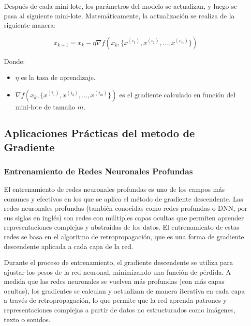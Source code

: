 \documentclass{article}
\begin{document}
	Después de cada mini-lote, los parámetros del modelo se actualizan, y luego se pasa al siguiente mini-lote.
	Matemáticamente, la actualización se realiza de la siguiente manera:
	
	\[
	x_{k+1} = x_k - \eta \nabla f\left(x_k, \{ x^{(i_1)}, x^{(i_2)}, \dots, x^{(i_m)} \} \right)
	\]
	
	Donde:
	\begin{itemize}
		\item \( \eta \) es la tasa de aprendizaje.
		\item \( \nabla f\left(x_k, \{ x^{(i_1)}, x^{(i_2)}, \dots, x^{(i_m)} \} \right) \) es el gradiente calculado en función del mini-lote de tamaño \( m \).
	\end{itemize}
	
	\subsection{Aplicaciones Prácticas del metodo de Gradiente}
	
	\subsubsection{Entrenamiento de Redes Neuronales Profundas}
	
	El entrenamiento de redes neuronales profundas es uno de los campos más comunes y efectivos en los que se aplica el método de gradiente descendente. Las redes neuronales profundas (también conocidas como redes profundas o DNN, por sus siglas en inglés) son redes con múltiples capas ocultas que permiten aprender representaciones complejas y abstraídas de los datos. El entrenamiento de estas redes se basa en el algoritmo de retropropagación, que es una forma de gradiente descendente aplicada a cada capa de la red.
	
	Durante el proceso de entrenamiento, el gradiente descendente se utiliza para ajustar los pesos de la red neuronal, minimizando una función de pérdida. A medida que las redes neuronales se vuelven más profundas (con más capas ocultas), los gradientes se calculan y actualizan de manera iterativa en cada capa a través de retropropagación, lo que permite que la red aprenda patrones y representaciones complejas a partir de datos no estructurados como imágenes, texto o sonidos.
	
\end{document}
